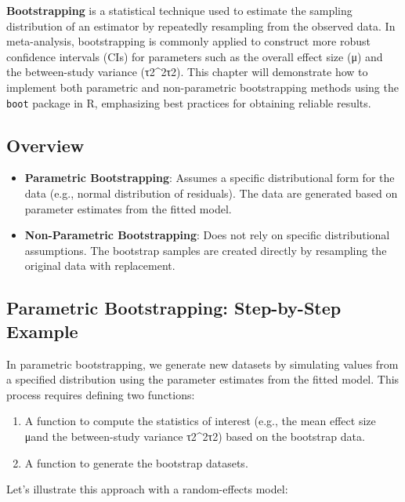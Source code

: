 \documentclass[
]{book}
\begin{document}
\textbf{Bootstrapping} is a statistical technique used to estimate the sampling distribution of an estimator by repeatedly resampling from the observed data. In meta-analysis, bootstrapping is commonly applied to construct more robust confidence intervals (CIs) for parameters such as the overall effect size (μ) and the between-study variance (τ2\tau\^{}2τ2). This chapter will demonstrate how to implement both parametric and non-parametric bootstrapping methods using the \texttt{boot} package in R, emphasizing best practices for obtaining reliable results.

\subsection{Overview}\label{overview}

\begin{itemize}
\item
  \textbf{Parametric Bootstrapping}: Assumes a specific distributional form for the data (e.g., normal distribution of residuals). The data are generated based on parameter estimates from the fitted model.
\item
  \textbf{Non-Parametric Bootstrapping}: Does not rely on specific distributional assumptions. The bootstrap samples are created directly by resampling the original data with replacement.
\end{itemize}

\subsection{Parametric Bootstrapping: Step-by-Step Example}\label{parametric-bootstrapping-step-by-step-example}

In parametric bootstrapping, we generate new datasets by simulating values from a specified distribution using the parameter estimates from the fitted model. This process requires defining two functions:

\begin{enumerate}
\def\labelenumi{\arabic{enumi}.}
\item
  A function to compute the statistics of interest (e.g., the mean effect size μ and the between-study variance τ2\tau\^{}2τ2) based on the bootstrap data.
\item
  A function to generate the bootstrap datasets.
\end{enumerate}

Let's illustrate this approach with a random-effects model:
\end{document}
